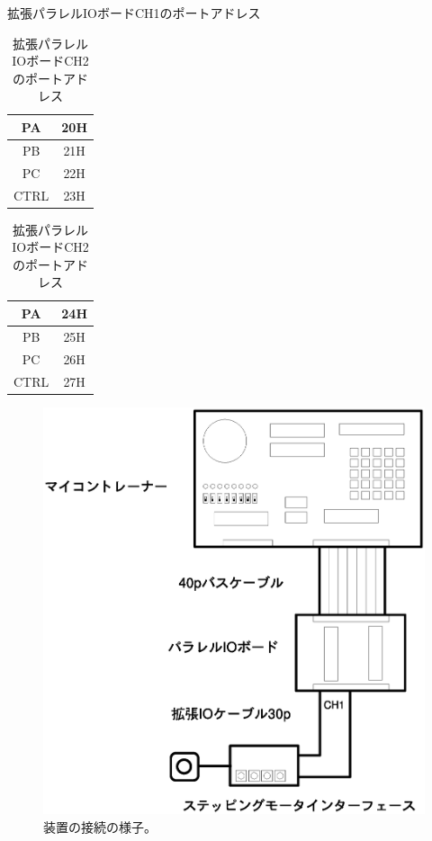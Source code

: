\begin{table}
\begin{minipage}{0.5\hsize}
\begin{center}
\caption{拡張パラレルIOボードCH1のポートアドレス}
\label{tab:ch1}
\begin{tabular}{|c|c|}
\hline
PA& 20H\\ \hline
PB& 21H\\ \hline
PC& 22H\\ \hline
CTRL& 23H\\
\hline
\end{tabular}
\end{center}
\end{minipage}
\begin{minipage}{0.5\hsize}
\begin{center}
\caption{拡張パラレルIOボードCH2のポートアドレス}
\label{tab:ch2}
\begin{tabular}{|c|c|}
\hline
PA& 24H\\ \hline
PB& 25H\\ \hline
PC& 26H\\ \hline
CTRL& 27H\\
\hline
\end{tabular}
\end{center}
\end{minipage}
\end{table}

\begin{figure}[htbp]
\begin{center}
\includegraphics[width=1\linewidth]{img/connection-io.eps}
\caption{装置の接続の様子。}
\label{fig:connection-io}
\end{center}
\end{figure}

